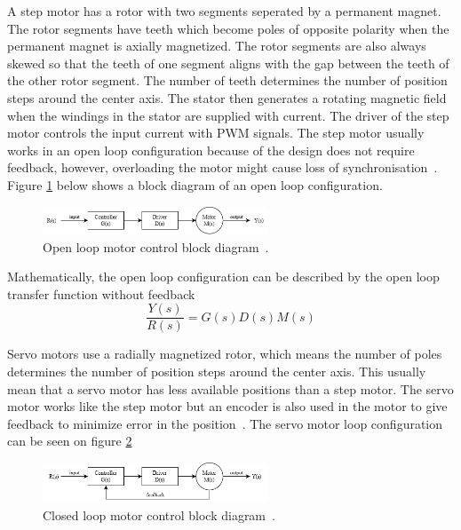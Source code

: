A step motor has a rotor with two segments seperated by a permanent magnet. The rotor segments have teeth which become poles of opposite polarity when the permanent magnet is axially magnetized. The rotor segments are also always skewed so that the teeth of one segment aligns with the gap between the teeth of the other rotor segment. The number of teeth determines the number of position steps around the center axis. The stator then generates a rotating magnetic field when the windings in the stator are supplied with current. The driver of the step motor controls the input current with PWM signals. The step motor usually works in an open loop configuration because of the design does not require feedback, however, overloading the motor might cause loss of synchronisation~\cite{servo_step}. Figure \ref{fig:open_loop} below shows a block diagram of an open loop configuration.
\begin{figure}[H]
    \centering
    \includegraphics[width=0.6\textwidth]{figures/open-loop.png}
    \caption{Open loop motor control block diagram~\cite{loop}.} \label{fig:open_loop}
\end{figure}

Mathematically, the open loop configuration can be described by the open loop transfer function without feedback
\begin{equation}
    \frac{Y(s)}{R(s)} = G(s)D(s)M(s)
\end{equation}

Servo motors use a radially magnetized rotor, which means the number of poles determines the number of position steps around the center axis. This usually mean that a servo motor has less available positions than a step motor. The servo motor works like the step motor but an encoder is also used in the motor to give feedback to minimize error in the position~\cite{servo_step}. The servo motor loop configuration can be seen on figure \ref{fig:closed_loop} 

\begin{figure}[H]
    \centering
    \includegraphics[width=0.6\textwidth]{figures/closed-loop.png}
    \caption{Closed loop motor control block diagram~\cite{loop}.} \label{fig:closed_loop}
\end{figure}

